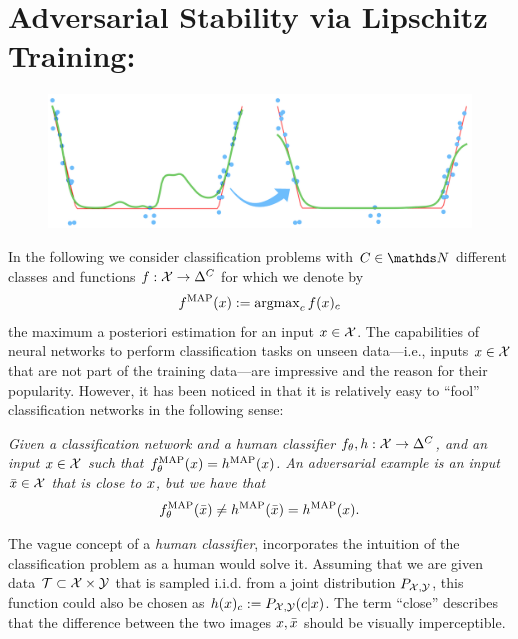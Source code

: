 \section{Adversarial Stability via Lipschitz Training: \cite{bungert2021clip}}\label{sec:CLIP}
%
\begin{figure}
	\centering
	\includegraphics[width=.5\textwidth]{atelier/CLIP/CLIP.png}
\end{figure}
%
%
In the following we consider classification problems with $C\in\N$ different classes and functions $f:\mathcal{X}\to\Delta^C$ for which we denote by 
\begin{align*}
f^{\operatorname{MAP}}(x):=\operatorname{argmax}_c f(x)_c
\end{align*}%
%
the maximum a posteriori estimation for an input $x\in\mathcal{X}$. The capabilities of neural networks to perform classification tasks on unseen data---i.e., inputs $x\in\mathcal{X}$ that are not part of the training data---are impressive and the reason for their popularity. However, it has been noticed in \cite{goodfellow2014explaining} that it is relatively easy to \enquote{fool} classification networks in the following sense:
%
\vspace{.5em}%

\begin{minipage}{.95\textwidth}%
\textit{%
Given a classification network and a human classifier $f_\theta, h:\mathcal{X}\to\Delta^C$, and an input $x\in\mathcal{X}$ such that $f_\theta^{\operatorname{MAP}}(x) = h^{\operatorname{MAP}}(x)$. An adversarial example is an input $\bar{x}\in \mathcal{X}$ that is close to $x$, but we have that
%
\begin{align*}
f_\theta^{\operatorname{MAP}}(\bar{x})\neq h^{\operatorname{MAP}}(\bar{x}) = h^{\operatorname{MAP}}(x).
\end{align*}
}
\end{minipage}%
\vspace{.5em}%

%
%
\noindent The vague concept of a \emph{human classifier}, incorporates the intuition of the classification problem as a human would solve it. Assuming that we are given data $\mathcal{T}\subset \mathcal{X}\times\mathcal{\mathcal{Y}}$ that is sampled i.i.d. from a joint distribution $P_{\mathcal{X},\mathcal{\mathcal{Y}}}$, this function could also be chosen as $h(x)_c:=P_{\mathcal{X},\mathcal{\mathcal{Y}}}(c|x)$. The term \enquote{close} describes that the difference between the two images $x,\bar{x}$ should be visually imperceptible.


